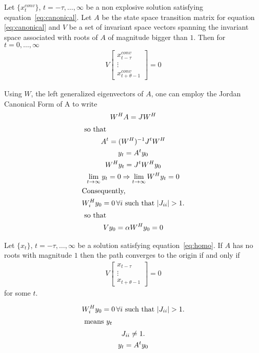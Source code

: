 \documentclass{elsart}
\begin{document}
\begin{thrm}\label{nonExp}
Let $\{x^{conv}_t\}$, $t= -\tau,\ldots,\infty$ be a non explosive solution satisfying
equation~\ref{eq:canonical}. Let $A$ be the state space transition matrix
for equation
\ref{eq:canonical} and $V$ be a set of
invariant space vectors spanning the invariant space
associated with roots of
$A$ of magnitude bigger than $1$. Then for $t= 0,\ldots,\infty$
\begin{gather}
V 
\begin{bmatrix}
  x^{conv}_{t-\tau}\\
\vdots\\
  x^{conv}_{t+\theta-1}
\end{bmatrix}=0
\end{gather}
\end{thrm}
\begin{prf}
Using  $W$, the left generalized eigenvectors of $A$, one can employ the
 Jordan Canonical Form of A to write
\begin{gather}
  W^H A  = J W^H \\
\intertext{ so that}
A^t =  (W^H)^{-1} J^t W^H\\
y_t = A^t y_0\\
W^H y_t = J^t W^H y_0\\
\lim_{t\rightarrow \infty} y_t =0 \Rightarrow
\lim_{t\rightarrow \infty} W^H y_t =0 \\\intertext{Consequently,}
W_i^H y_0 =0 \, \forall i \text{ such that } |J_{ii}| > 1.\\ \intertext{ so that }
V y_0 = \alpha W^H y_0 = 0
\end{gather}
\end{prf}

\begin{crrlry}\label{cnvrg}
Let $\{x_t\}$, $t= -\tau,\ldots,\infty$ be a  solution satisfying
equation~\ref{eq:homo}.  
If $A$ has no roots with magnitude $1$ then the 
path converges to the
origin if and only if
\begin{gather}
V 
\begin{bmatrix}
  x_{t-\tau}\\
\vdots\\
  x_{t+\theta-1}
\end{bmatrix}=0
\end{gather}
for some $t$.
\end{crrlry}
\begin{prf}
  \begin{gather}
W_i^H y_0 =0 \, \forall i \text{ such that } |J_{ii}| > 1.\\ \intertext{ means $y_t$ }
    J_{ii} \ne 1.\\
y_t = A^t y_0
  \end{gather}
\end{prf}
\end{document}
